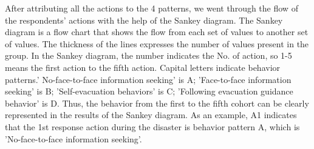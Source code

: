 After attributing all the actions to the 4 patterns, we went through the flow of the respondents' actions with the help of the Sankey diagram. The Sankey diagram is a flow chart that shows the flow from each set of values to another set of values. The thickness of the lines expresses the number of values present in the group. In the Sankey diagram, the number indicates the No. of action, so 1-5 means the first action to the fifth action. Capital letters indicate behavior patterns.' No-face-to-face information seeking' is A; 'Face-to-face information seeking' is B; 'Self-evacuation behaviors' is C; 'Following evacuation guidance behavior' is D. Thus, the behavior from the first to the fifth cohort can be clearly represented in the results of the Sankey diagram. As an example, A1 indicates that the 1st response action during the disaster is behavior pattern A, which is 'No-face-to-face information seeking'.




























